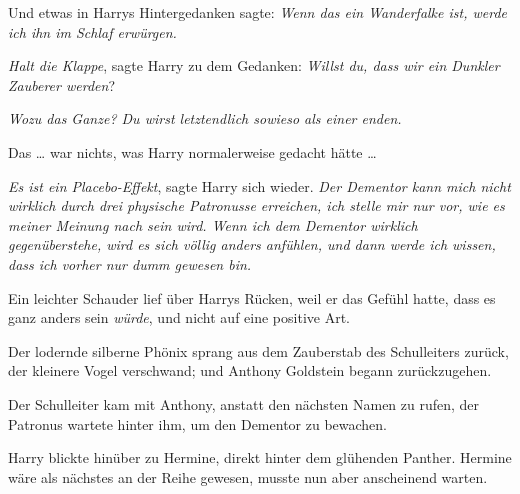 Und etwas in Harrys Hintergedanken sagte: \emph{Wenn das ein Wanderfalke ist, werde ich ihn im Schlaf erwürgen.}

\emph{Halt die Klappe}, sagte Harry zu dem Gedanken: \emph{Willst du, dass wir ein Dunkler Zauberer werden}?

\emph{Wozu das Ganze? Du wirst letztendlich sowieso als einer enden.}

Das … war nichts, was Harry normalerweise gedacht hätte …

\emph{Es ist ein Placebo-Effekt}, sagte Harry sich wieder. \emph{Der Dementor kann mich nicht wirklich durch drei physische Patronusse erreichen, ich stelle mir nur vor, wie es meiner Meinung nach sein wird. Wenn ich dem Dementor wirklich gegenüberstehe, wird es sich völlig anders anfühlen, und dann werde ich wissen, dass ich vorher nur dumm gewesen bin.}

Ein leichter Schauder lief über Harrys Rücken, weil er das Gefühl hatte, dass es ganz anders sein \emph{würde}, und nicht auf eine positive Art.

Der lodernde silberne Phönix sprang aus dem Zauberstab des Schulleiters zurück, der kleinere Vogel verschwand; und Anthony Goldstein begann zurückzugehen.

Der Schulleiter kam mit Anthony, anstatt den nächsten Namen zu rufen, der Patronus wartete hinter ihm, um den Dementor zu bewachen.

Harry blickte hinüber zu Hermine, direkt hinter dem glühenden Panther. Hermine wäre als nächstes an der Reihe gewesen, musste nun aber anscheinend warten.


